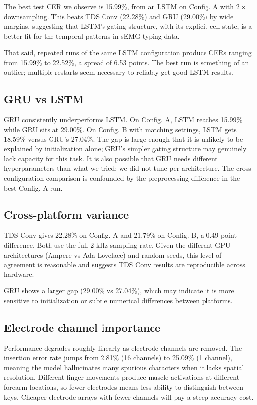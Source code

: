 \documentclass{article}
\begin{document}
The best test CER we observe is 15.99\%, from an LSTM on Config. A with $2\times$ downsampling. This beats TDS Conv (22.28\%) and GRU (29.00\%) by wide margins, suggesting that LSTM's gating structure, with its explicit cell state, is a better fit for the temporal patterns in sEMG typing data.

That said, repeated runs of the same LSTM configuration produce CERs ranging from 15.99\% to 22.52\%, a spread of 6.53 points. The best run is something of an outlier; multiple restarts seem necessary to reliably get good LSTM results.

\subsection{GRU vs LSTM}

GRU consistently underperforms LSTM. On Config. A, LSTM reaches 15.99\% while GRU sits at 29.00\%. On Config. B with matching settings, LSTM gets 18.59\% versus GRU's 27.04\%. The gap is large enough that it is unlikely to be explained by initialization alone; GRU's simpler gating structure may genuinely lack capacity for this task. It is also possible that GRU needs different hyperparameters than what we tried; we did not tune per-architecture. The cross-configuration comparison is confounded by the preprocessing difference in the best Config. A run.

\subsection{Cross-platform variance}

TDS Conv gives 22.28\% on Config. A and 21.79\% on Config. B, a 0.49 point difference. Both use the full 2 kHz sampling rate. Given the different GPU architectures (Ampere vs Ada Lovelace) and random seeds, this level of agreement is reasonable and suggests TDS Conv results are reproducible across hardware.

GRU shows a larger gap (29.00\% vs 27.04\%), which may indicate it is more sensitive to initialization or subtle numerical differences between platforms. 

\subsection{Electrode channel importance}

Performance degrades roughly linearly as electrode channels are removed. The insertion error rate jumps from 2.81\% (16 channels) to 25.09\% (1 channel), meaning the model hallucinates many spurious characters when it lacks spatial resolution. Different finger movements produce muscle activations at different forearm locations, so fewer electrodes means less ability to distinguish between keys. Cheaper electrode arrays with fewer channels will pay a steep accuracy cost.
\end{document}
